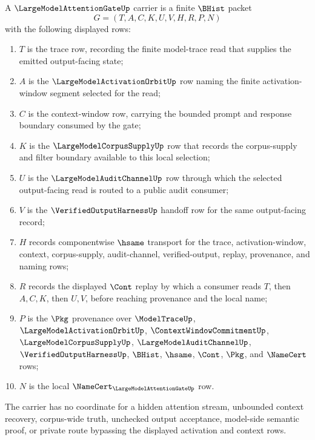 \begin{definition}
\label{def:large-model-attention-gate-carrier}
A $\LargeModelAttentionGateUp$ carrier is a finite $\BHist$ packet
$$
G=(T,A,C,K,U,V,H,R,P,N)
$$
with the following displayed rows:
\begin{enumerate}
\item $T$ is the trace row, recording the finite model-trace read that supplies the emitted output-facing state;
\item $A$ is the $\LargeModelActivationOrbitUp$ row naming the finite activation-window segment selected for the read;
\item $C$ is the context-window row, carrying the bounded prompt and response boundary consumed by the gate;
\item $K$ is the $\LargeModelCorpusSupplyUp$ row that records the corpus-supply and filter boundary available to this local selection;
\item $U$ is the $\LargeModelAuditChannelUp$ row through which the selected output-facing read is routed to a public audit consumer;
\item $V$ is the $\VerifiedOutputHarnessUp$ handoff row for the same output-facing record;
\item $H$ records componentwise $\hsame$ transport for the trace, activation-window, context, corpus-supply, audit-channel, verified-output, replay, provenance, and naming rows;
\item $R$ records the displayed $\Cont$ replay by which a consumer reads $T$, then $A,C,K$, then $U,V$, before reaching provenance and the local name;
\item $P$ is the $\Pkg$ provenance over $\ModelTraceUp$, $\LargeModelActivationOrbitUp$, $\ContextWindowCommitmentUp$, $\LargeModelCorpusSupplyUp$, $\LargeModelAuditChannelUp$, $\VerifiedOutputHarnessUp$, $\BHist$, $\hsame$, $\Cont$, $\Pkg$, and $\NameCert$ rows;
\item $N$ is the local $\NameCert_{\LargeModelAttentionGateUp}$ row.
\end{enumerate}
The carrier has no coordinate for a hidden attention stream, unbounded context recovery, corpus-wide truth, unchecked output acceptance, model-side semantic proof, or private route bypassing the displayed activation and context rows.
\end{definition}

